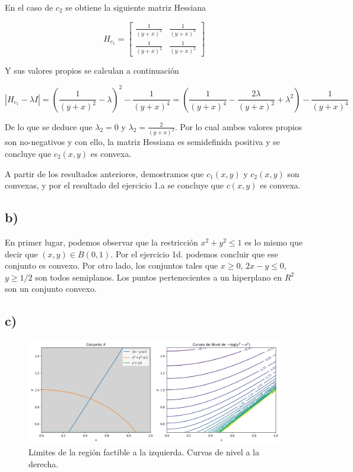 \documentclass[10pt,a4paper]{report}
\begin{document}
	En el caso de $c_2$ se obtiene la siguiente matriz Hessiana
	
	\[ H_{c_1} = \begin{bmatrix}
		\frac{1}{(y+x)^2} & \frac{1}{(y+x)^2}\\
		\frac{1}{(y+x)^2} & \frac{1}{(y+x)^2}
	\end{bmatrix} \]
	
	Y sus valores propios se calculan a continuación
	
	$$|H_{c_1} - \lambda I| = (\frac{1}{(y+x)^2}-\lambda)^2 - \frac{1}{(y+x)^4} = (\frac{1}{(y+x)^4}-\frac{2\lambda }{(y+x)^2} + \lambda^2 ) - \frac{1}{(y+x)^4}$$
	
	De lo que se deduce que $\lambda_2 = 0$ y $\lambda_2 = \frac{2}{(y+x)^2}$. Por lo cual ambos valores propios son no-negativos y con ello, la matriz Hessiana es semidefinida positiva y se concluye que $c_2(x,y)$ es convexa.
	
	A partir de los resultados anteriores, demostramos que $c_1(x,y)$ y $c_2(x,y)$ son convexas, y por el resultado del ejercicio 1.a se concluye que $c(x,y)$ es convexa.
	
	\subsection*{b) }
	
	En primer lugar, podemos observar que la restricción $x^2 + y^2 \leq 1$ es lo mismo que decir que $(x,y) \in B(0, 1)$. Por el ejercicio 1d. podemos concluir que ese conjunto es convexo. Por otro lado, los conjuntos tales que $x \geq 0$, $2x-y \leq 0$, $y\geq 1/2$ son todos semiplanos. Los puntos pertenecientes a un hiperplano en $R^2$ son un conjunto convexo.
	
	\FloatBarrier 
	
	\subsection*{c) }
	
	\begin{figure}[!ht]
		\centering
		\includegraphics[width=1.2\textwidth]{ej2-1.png}
		\caption{Limites de la región factible a la izquierda. Curvas de nivel a la derecha.}
		\label{ej2-1}
		
	\end{figure}
	
\end{document}
